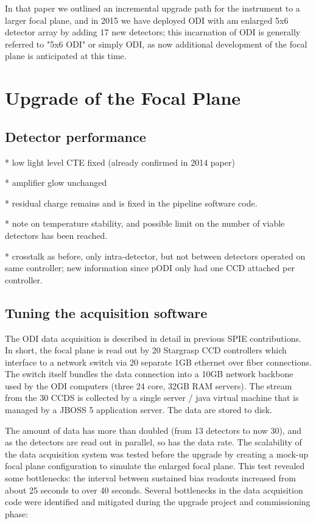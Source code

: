 \documentclass[]{spieman}
\begin{document}
In that paper we outlined an incremental upgrade path for the instrument to a larger focal plane, 
and in 2015 we have deployed ODI with am enlarged 5x6 detector array by adding 17 new detectors; 
this incarnation of ODI is generally referred to "5x6 ODI" or simply ODI, as now additional 
development of the focal plane is anticipated at this time.


\section{Upgrade of the Focal Plane}

\subsection{Detector performance}

* low light level CTE fixed (already confirmed in 2014 paper)

* amplifier glow unchanged

* residual charge remains and is fixed in the pipeline software code.  

\cite{Lesser2012}

* note on temperature stability, and possible limit on the number of viable detectors has been 
reached.

* crosstalk as before, only intra-detector, but not between detectors operated on same controller; 
new information since pODI only had one CCD attached per controller. 



\subsection{Tuning the acquisition software}

The ODI data acquisition is described in detail in previous SPIE contributions\cite{Yeatts2008,Yeatts2010}.
In short, the focal plane is read out by 20 Stargrasp CCD controllers which
interface to a network switch via 20 separate 1GB ethernet over fiber
connections. The switch itself bundles the data connection into a 10GB network
backbone used by the ODI computers (three 24 core, 32GB RAM servers). The stream
from the 30 CCDS is collected by a single server / java virtual machine that is
managed by a JBOSS 5 application server. The data are stored to disk.

The amount of data has more than doubled (from 13 detectors to now 30), and as
the detectors are read out in parallel, so has the data rate. The scalability of
the data acquisition system was tested before the upgrade by creating a mock-up
focal plane  configuration to simulate the enlarged focal plane. This test
revealed some bottlenecks: the interval between sustained bias readouts
increased from about 25 seconds to over 40 seconds. Several bottlenecks in the
data acquisition code were identified and mitigated during the upgrade project
and commissioning phase:
\end{document}
